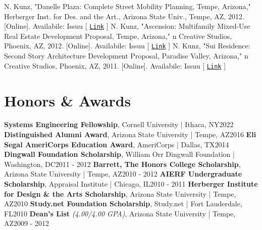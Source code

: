 \documentclass{article}
\begin{document}
        N. Kunz, "Danelle Plaza: Complete Street Mobility Planning, Tempe, Arizona," Herberger Inst. for Des. and the Art., Arizona State Univ., Tempe, AZ, 2012. [Online]. Availabile:\newline\newline
        \faBook\space Issuu [ \href{https://issuu.com/nickkunz/docs/danelle_plaza}{\texttt{Link}} ]\newline\newline
        N. Kunz, "Ascension: Multifamily Mixed-Use Real Estate Development Proposal, Tempe, Arizona," n Creative Studios, Phoenix, AZ, 2012. [Online]. Availabile:\newline\newline
        \faBook\space Issuu [ \href{https://issuu.com/nickkunz/docs/ascension}{\texttt{Link}} ]\newline\newline
        N. Kunz, "Sui Residence: Second Story Architecture Development Proposal, Paradise Valley, Arizona," n Creative Studios, Phoenix, AZ, 2011. [Online]. Availabile:\newline\newline
        \faBook\space Issuu [ \href{https://issuu.com/nickkunz/docs/sui}{\texttt{Link}} ]
\newpage
    \section*{Honors \& Awards}
        \textbf{Systems Engineering Fellowship}, Cornell University | Ithaca, NY\hfill{2022}\newline
        \textbf{Distinguished Alumni Award}, Arizona State University | Tempe, AZ\hfill{2016}\newline
        \textbf{Eli Segal AmeriCorps Education Award}, AmeriCorps | Dallas, TX\hfill{2014}\newline
        \textbf{Dingwall Foundation Scholarship}, William Orr Dingwall Foundation | Washington, DC\hfill{2011 - 2012}\newline
        \textbf{Barrett, The Honors College Scholarship}, Arizona State University | Tempe, AZ\hfill{2010 - 2012}\newline
        \textbf{AIERF Undergraduate Scholarship}, Appraisal Institute | Chicago, IL\hfill{2010 - 2011}\newline
        \textbf{Herberger Institute for Design \& the Arts Scholarship}, Arizona State University | Tempe, AZ\hfill{2010}\newline
        \textbf{Study.net Foundation Scholarship}, Study.net | Fort Lauderdale, FL\hfill{2010}\newline
        \textbf{Dean's List} \textit{(4.00/4.00 GPA)}, Arizona State University | Tempe, AZ\hfill{2009 - 2012}
\end{document}
